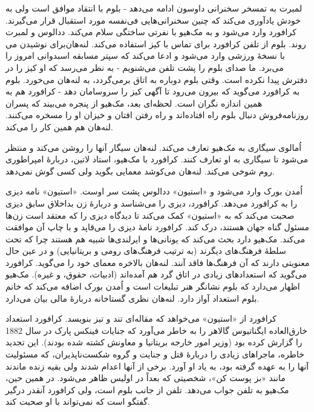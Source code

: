 \documentclass[12pt]{book}
\newcommand{\noun}[1]{«{#1}»}
\begin{document}
    لمبرت به تمسخر سخنرانی داوسون ادامه می‌دهد - بلوم با انتقاد موافق است ولی به خودش یادآوری می‌کند که چنین سخنرانی‌هایی فی‌نفسه مورد استقبال قرار می‌گیرند. کرافورد وارد می‌شود و به مک‌هیو با نفرتی ساختگی سلام می‌کند. ددالوس و لمبرت برای نوشیدن می‎‌روند. بلوم از تلفن کرافورد برای تماس با کیز استفاده می‌کند. لنه‌هان با نسخۀ ورزشی وارد می‌شود و ادعا می‌کند که سپتر مسابقه اسبدوانی امروز را می‌برد. ما صدای بلوم را پشت تلفن می‌شنویم - به نظر می‌رسد که او کیز را در دفترش پیدا نکرده است. وقتی بلوم دوباره به اتاق برمی‌گردد، به لنه‌هان می‌خورد. بلوم به کرافورد می‌گوید که بیرون می‌رود تا آگهی کیز را سروسامان دهد - کرافورد هم به همین اندازه نگران است. لحظه‌ای بعد، مک‌هیو از پنجره می‌بیند که پسران روزنامه‌فروش دنبال بلوم راه افتاده‌اند و راه رفتن افتان و خیزان او را مسخره می‌کنند. لنه‌هان هم همین کار را می‌کند.

    اُمالوی سیگاری به مک‌هیو تعارف می‌کند. لنه‌هان سیگار آنها را روشن می‌کند و منتظر می‌شود تا سیگاری به او تعارف کنند. کرافورد با مک‌هیو، استاد لاتین، دربارۀ امپراطوری روم شوخی می‌کند. لنه‌هان می‌کوشد معمایی بگوید ولی کسی گوش نمی‌دهد.

    اُمدن بورک وارد می‌شود و \noun{استیون} ددالوس پشت سر اوست. \noun{استیون} نامه دیزی را به کرافورد می‌دهد. کرافورد، دیزی را می‌شناسد و دربارۀ زن بداخلاق سابق دیزی صحبت می‌کند که به \noun{استیون} کمک می‌کند تا دیدگاه دیزی را که معتقد است زن‌ها مسئول گناه جهان هستند، درک کند. کرافورد نامۀ دیزی را می‌قاپد و با چاپ آن موافقت می‌کند. مک‌هیو دارد بحث می‌کند که یونانی‌ها و ایرلندی‌ها شبیه هم هستند چرا که تحت سلطۀ فرهنگ‌های دیگرند (به ترتیب فرهنگ‌های رومی و بریتانیایی) و در عین حال معنویتی دارند که آن فرهنگ‌ها فاقد آنند. لنه‌هان بالاخره معمای خود را می‌گوید. کرافورد می‌گوید که استعدادهای زیادی در اتاق گرد هم آمده‌اند (ادبیات، حقوق، و غیره). مک‌هیو اظهار می‌دارد که بلوم نشانگر هنر تبلیغات است و اُمدن بورک اضافه می‌کند که خانم بلوم استعداد آواز دارد. لنه‌هان نظری گستاخانه دربارۀ مالی بیان می‌دارد.

    کرافورد از \noun{استیون} می‌خواهد که مقاله‌ای تند و تیز بنویسد. کرافورد استعداد خارق‌العاده ایگناتیوس گالاهر را به خاطر می‌آورد که جنایات فینکس پارک در سال 1882 را گزارش کرده بود (وزیر امور خارجه بریتانیا و معاونش کشته شده بودند). این تجدید خاطره، ماجراهای زیادی را دربارۀ قتل و جنایت و گروه شکست‌ناپذیران، که مسئولیت آنها را به عهده گرفته بود، به یاد او آورد. برخی از آنها اعدام شدند ولی بقیه زنده ماندند مانند «بز پوست کن»، شخصیتی که بعداً در اولیس ظاهر می‌شود. در همین حین، مک‌هیو به تلفن جواب می‌دهد. تلفن از جانب بلوم است، ولی کرافورد آنقدر درگیر گفتگو است که نمی‌تواند با او صحبت کند.
\end{document}
